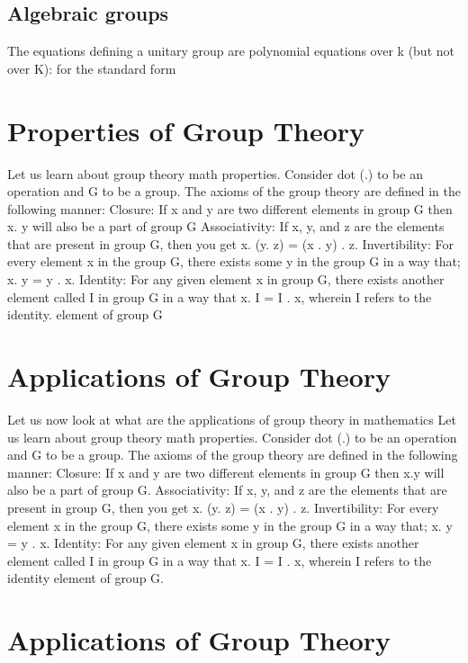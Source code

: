 \documentclass[18pt,a4paper]{article}
\begin{document}
 
\subsection{Algebraic groups}
The equations defining a unitary group are polynomial equations over k (but not over K): for the standard form 

\section{Properties of Group Theory}
Let us learn about group theory math properties.
Consider dot (.) to be an operation and G to be a group. The axioms of the group theory are defined in the following manner:
Closure: If x and y are two different elements in group G then x. y will also be a part of group G
Associativity: If x, y, and z are the elements that are present in group G, then you get x. (y. z) = (x . y) . z.
Invertibility: For every element x in the group G, there exists some y in the group G in a way that; x. y = y . x.
Identity:  For any given element x in group G, there exists another element called I in group G in a way that x. I = I . x, wherein I refers to the identity. element of group G

\section{Applications of Group Theory}
Let us now look at what are the applications of group theory in mathematics
Let us learn about group theory math properties.
Consider dot (.) to be an operation and G to be a group. The axioms of the group theory are defined in the following manner:
Closure: If x and y are two different elements in group G then x.y will also be a part of group G.
Associativity: If x, y, and z are the elements that are present in group G, then you get x. (y. z) = (x . y) . z.
Invertibility: For every element x in the group G, there exists some y in the group G in a way that; x. y = y . x.
Identity:  For any given element x in group G, there exists another element called I in group G in a way that x. I = I . x, wherein I refers to the identity element of group G.

\section{Applications of Group Theory}
\end{document}
